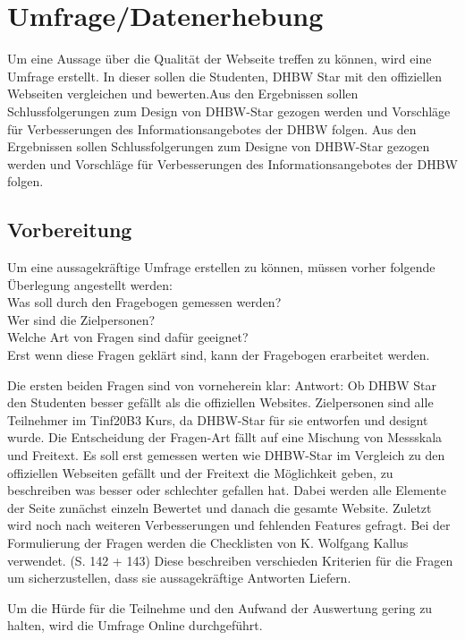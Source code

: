 \chapter{Umfrage/Datenerhebung}
Um eine Aussage über die Qualität der Webseite treffen zu können, wird eine Umfrage erstellt. In dieser sollen die Studenten, DHBW Star mit den offiziellen Webseiten vergleichen und bewerten.Aus den Ergebnissen sollen Schlussfolgerungen zum Design von DHBW-Star gezogen werden und Vorschläge für Verbesserungen des Informationsangebotes der DHBW folgen.
Aus den Ergebnissen sollen Schlussfolgerungen zum Designe von DHBW-Star gezogen werden und Vorschläge für Verbesserungen des Informationsangebotes der DHBW folgen.

\section{Vorbereitung}
Um eine aussagekräftige Umfrage erstellen zu können, müssen vorher folgende Überlegung angestellt werden: \\
Was soll durch den Fragebogen gemessen werden? \\
Wer sind die Zielpersonen? \\
Welche Art von Fragen sind dafür geeignet? \\
Erst wenn diese Fragen geklärt sind, kann der Fragebogen erarbeitet werden.

Die ersten beiden Fragen sind von vorneherein klar:
Antwort: Ob DHBW Star den Studenten besser gefällt als die offiziellen Websites.
Zielpersonen sind alle Teilnehmer im Tinf20B3 Kurs, da DHBW-Star für sie entworfen und designt wurde.
Die Entscheidung der Fragen-Art fällt auf eine Mischung von Messskala und Freitext. Es soll erst gemessen werten wie DHBW-Star im Vergleich zu den offiziellen Webseiten gefällt und der Freitext die Möglichkeit geben, zu beschreiben was besser oder schlechter gefallen hat.
Dabei werden alle Elemente der Seite zunächst einzeln Bewertet und danach die gesamte Website.
Zuletzt wird noch nach weiteren Verbesserungen und fehlenden Features gefragt.
Bei der Formulierung der Fragen werden die Checklisten von K. Wolfgang Kallus verwendet.
\cite{fragebogenKallus}(S. 142 + 143)
Diese beschreiben verschieden Kriterien für die Fragen um sicherzustellen, dass sie aussagekräftige Antworten Liefern.

Um die Hürde für die Teilnehme und den Aufwand der Auswertung gering zu halten, wird die Umfrage Online durchgeführt.

